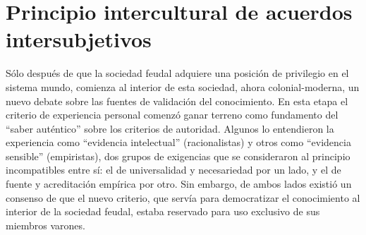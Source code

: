 \documentclass[a4paper,10pt]{book}
\begin{document}
\section{Principio intercultural de acuerdos intersubjetivos}

Sólo después de que la sociedad feudal adquiere una posición de privilegio en el sistema mundo, comienza al interior de esta sociedad, ahora colonial-moderna, un nuevo debate sobre las fuentes de validación del conocimiento.
En esta etapa el criterio de experiencia personal comenzó ganar terreno como fundamento del ``saber auténtico'' sobre los criterios de autoridad.
Algunos lo entendieron la experiencia como ``evidencia intelectual'' (racionalistas) y otros como ``evidencia sensible'' (empiristas), dos grupos de exigencias que se consideraron al principio incompatibles entre sí: el de universalidad y necesariedad por un lado, y el de fuente y acreditación empírica por otro.
Sin embargo, de ambos lados existió un consenso de que el nuevo criterio, que servía para democratizar el conocimiento al interior de la sociedad feudal, estaba reservado para uso exclusivo de sus miembros varones.

\end{document}
